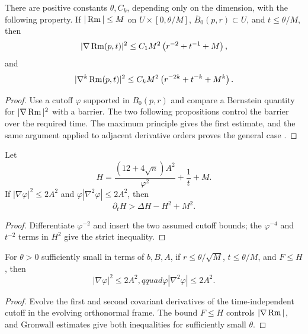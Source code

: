 \begin{theorem}
  \label{thm:cz-local-curvature-derivative-estimates}
There are positive constants $\theta,C_k$, depending only on the
dimension, with the following property.  If $|\operatorname{Rm}|\le M$ on
$U\times[0,\theta/M]$, $\overline B_0(p,r)\subset U$, and
$t\le\theta/M$, then
\[
|\nabla\operatorname{Rm}(p,t)|^2\le C_1M^2\left(r^{-2}+t^{-1}+M\right),
\]
and
\[
|\nabla^k\operatorname{Rm}(p,t)|^2\le C_kM^2\left(r^{-2k}+t^{-k}+M^k\right).
\]
\end{theorem}
\begin{proof}
\sketch Use a cutoff $\varphi$ supported in $B_0(p,r)$ and compare
a Bernstein quantity for $|\nabla\operatorname{Rm}|^2$ with a barrier.  The two
following propositions control the barrier over the required time.
The maximum principle gives the first estimate, and the same argument
applied to adjacent derivative orders proves the general case \cite{Sh89, Ha95F}.
\end{proof}

\begin{proposition}
  \label{prop:cz-cutoff-barrier-is-a-strict-supersolution}
Let
\[
H=\frac{(12+4\sqrt n)A^2}{\varphi^2}+\frac1t+M.
\]
If $|\nabla\varphi|^2\le2A^2$ and
$\varphi|\nabla^2\varphi|\le2A^2$, then
\[
\partial_tH>\Delta H-H^2+M^2.
\]
\end{proposition}
\begin{proof}
\sketch Differentiate $\varphi^{-2}$ and insert the two assumed
cutoff bounds; the $\varphi^{-4}$ and $t^{-2}$ terms in $H^2$ give
the strict inequality.
\end{proof}

\begin{proposition}
  \label{prop:cz-short-time-control-of-cutoff-derivatives}
For $\theta>0$ sufficiently small in terms of $b,B,A$, if
$r\le\theta/\sqrt M$, $t\le\theta/M$, and $F\le H$, then
\[
|\nabla\varphi|^2\le2A^2,qquad
\varphi|\nabla^2\varphi|\le2A^2.
\]
\end{proposition}
\begin{proof}
\sketch Evolve the first and second covariant derivatives of the
time-independent cutoff in the evolving orthonormal frame.  The bound
$F\le H$ controls $|\nabla\operatorname{Rm}|$, and Gronwall estimates give both
inequalities for sufficiently small $\theta$.
\end{proof}

